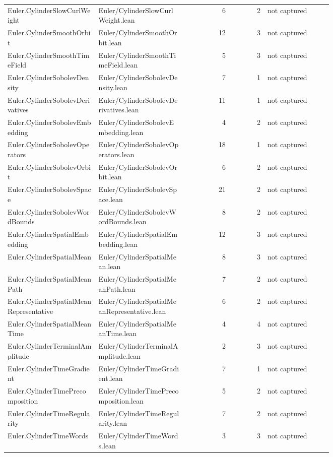\documentclass[10pt]{article}
\begin{document}
\begin{longtable}{p{0.28\linewidth}p{0.27\linewidth}r r p{0.20\linewidth}}
Euler.CylinderSlowCurlWeight & Euler/CylinderSlowCurlWeight.lean & 6 & 2 & not captured\\
Euler.CylinderSmoothOrbit & Euler/CylinderSmoothOrbit.lean & 12 & 3 & not captured\\
Euler.CylinderSmoothTimeField & Euler/CylinderSmoothTimeField.lean & 5 & 3 & not captured\\
Euler.CylinderSobolevDensity & Euler/CylinderSobolevDensity.lean & 7 & 1 & not captured\\
Euler.CylinderSobolevDerivatives & Euler/CylinderSobolevDerivatives.lean & 11 & 1 & not captured\\
Euler.CylinderSobolevEmbedding & Euler/CylinderSobolevEmbedding.lean & 4 & 2 & not captured\\
Euler.CylinderSobolevOperators & Euler/CylinderSobolevOperators.lean & 18 & 1 & not captured\\
Euler.CylinderSobolevOrbit & Euler/CylinderSobolevOrbit.lean & 6 & 2 & not captured\\
Euler.CylinderSobolevSpace & Euler/CylinderSobolevSpace.lean & 21 & 2 & not captured\\
Euler.CylinderSobolevWordBounds & Euler/CylinderSobolevWordBounds.lean & 8 & 2 & not captured\\
Euler.CylinderSpatialEmbedding & Euler/CylinderSpatialEmbedding.lean & 12 & 3 & not captured\\
Euler.CylinderSpatialMean & Euler/CylinderSpatialMean.lean & 8 & 3 & not captured\\
Euler.CylinderSpatialMeanPath & Euler/CylinderSpatialMeanPath.lean & 7 & 2 & not captured\\
Euler.CylinderSpatialMeanRepresentative & Euler/CylinderSpatialMeanRepresentative.lean & 6 & 2 & not captured\\
Euler.CylinderSpatialMeanTime & Euler/CylinderSpatialMeanTime.lean & 4 & 4 & not captured\\
Euler.CylinderTerminalAmplitude & Euler/CylinderTerminalAmplitude.lean & 2 & 3 & not captured\\
Euler.CylinderTimeGradient & Euler/CylinderTimeGradient.lean & 7 & 1 & not captured\\
Euler.CylinderTimePrecomposition & Euler/CylinderTimePrecomposition.lean & 5 & 2 & not captured\\
Euler.CylinderTimeRegularity & Euler/CylinderTimeRegularity.lean & 7 & 2 & not captured\\
Euler.CylinderTimeWords & Euler/CylinderTimeWords.lean & 3 & 3 & not captured\\

\end{longtable}
\end{document}
